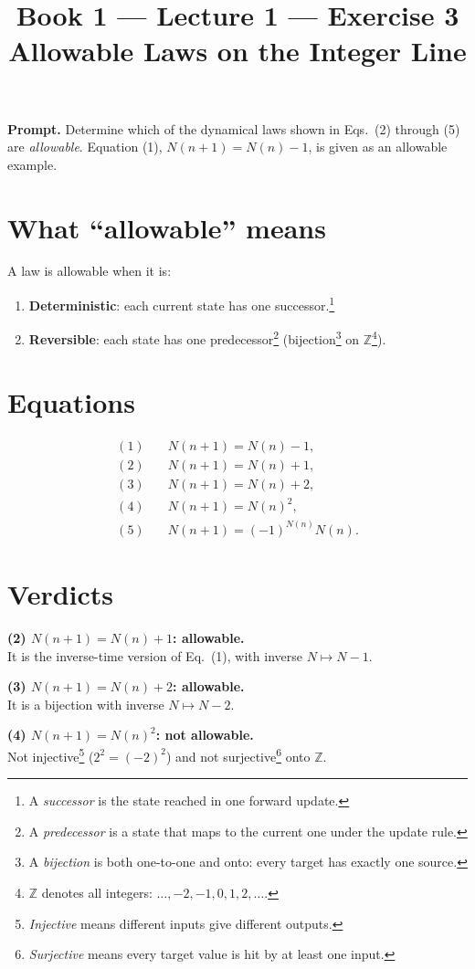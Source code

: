 \documentclass[11pt]{article}
\title{\textbf{Book 1 --- Lecture 1 --- Exercise 3}\\[2mm]
\large Allowable Laws on the Integer Line}
\author{}
\date{}
\newcommand{\promptbox}[1]{%
  \begingroup\setlength{\fboxsep}{10pt}\noindent
  \colorbox{blue!8}{\parbox{\dimexpr\linewidth-2\fboxsep\relax}{\textbf{Prompt. }#1}}
  \endgroup
}
\begin{document}
\maketitle

\promptbox{Determine which of the dynamical laws shown in Eqs.\ (2) through (5)
are \emph{allowable}. Equation (1), \(N(n+1)=N(n)-1\), is given as an allowable
example.}

\section*{What ``allowable'' means}
A law is allowable when it is:
\begin{enumerate}
  \item \textbf{Deterministic}: each current state has one successor.\footnote{A
  \emph{successor} is the state reached in one forward update.}
  \item \textbf{Reversible}: each state has one predecessor\footnote{A
  \emph{predecessor} is a state that maps to the current one under the update
  rule.} (bijection\footnote{A \emph{bijection} is both one-to-one and onto:
  every target has exactly one source.} on \(\mathbb{Z}\)\footnote{\(\mathbb{Z}\)
  denotes all integers: \(\dots,-2,-1,0,1,2,\dots\).}).
\end{enumerate}

\section*{Equations}
\[
\begin{aligned}
(1)\quad &N(n+1)=N(n)-1,\\
(2)\quad &N(n+1)=N(n)+1,\\
(3)\quad &N(n+1)=N(n)+2,\\
(4)\quad &N(n+1)=N(n)^2,\\
(5)\quad &N(n+1)=(-1)^{N(n)}N(n).
\end{aligned}
\]

\section*{Verdicts}
\textbf{(2) \(N(n+1)=N(n)+1\): allowable.}\\
It is the inverse-time version of Eq.\ (1), with inverse \(N\mapsto N-1\).

\textbf{(3) \(N(n+1)=N(n)+2\): allowable.}\\
It is a bijection with inverse \(N\mapsto N-2\).

\textbf{(4) \(N(n+1)=N(n)^2\): not allowable.}\\
Not injective\footnote{\emph{Injective} means different inputs give different
outputs.} (\(2^2=(-2)^2\)) and not surjective\footnote{\emph{Surjective} means
every target value is hit by at least one input.} onto \(\mathbb{Z}\).
\end{document}
